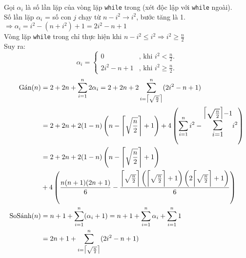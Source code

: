 \documentclass[../HW01.tex]{subfiles}
\begin{document}
\noindent
Gọi $\alpha_i$ là số lần lặp của vòng lặp \verb|while| trong (xét độc lập với \verb|while| ngoài).
\\Số lần lặp $\alpha_i$ = số con $j$ chạy từ $n-i^2 \to i^2$, bước tăng là 1.
\\$\Rightarrow \alpha_i=i^2-(n+i^2)+1=2i^2-n+1$
\\Vòng lặp \verb|while| trong chỉ thực hiện khi $n-i^2 \leq i^2 \Rightarrow i^2 \geq \frac{n}{2}$
\\Suy ra:
\\ $$\alpha_i=\begin{cases}
    0 &\text{, khi $i^2<\frac{n}{2}$}.\\
    2i^2-n+1 &\text{, khi $i^2 \geq \frac{n}{2}$}.
\end{cases}$$
\begin{align*}
    \text{Gán}(n)&=2+2n+\sum_{i=1}^{n}2\alpha_i=2+2n+2\sum_{i=\bigl\lceil\sqrt{\frac{n}{2}}\bigr\rceil}^{n}(2i^2-n+1)\\
    &=2+2n+2(1-n)\left(n-\Biggl\lceil\sqrt{\frac{n}{2}}\Biggr\rceil+1\right)+4\left(\sum_{i=1}^{n}i^2-\text{\Large$\sum_{i=1}^{\bigl\lceil\sqrt{\frac{n}{2}}\bigr\rceil-1}$}i^2\right)\\
    &=2+2n+2(1-n)\left(n-\Biggl\lceil\sqrt{\frac{n}{2}}\Biggr\rceil+1\right)\\
    &+4\left(\frac{n(n+1)(2n+1)}{6}-\frac{\biggl\lceil\sqrt{\frac{n}{2}}\biggr\rceil\left(\biggl\lceil\sqrt{\frac{n}{2}}\biggr\rceil+1\right)\left(2\biggl\lceil\sqrt{\frac{n}{2}}\biggr\rceil+1\right)}{6}\right)\\
    \text{SoSánh}(n)&=n+1+\sum_{i=1}^{n}(\alpha_i+1)=n+1+\sum_{i=1}^{n}\alpha_i+\sum_{i=1}^{n}1\\
    &=2n+1+\sum_{i=\bigl\lceil\sqrt{\frac{n}{2}}\bigr\rceil}^{n}(2i^2-n+1)
\end{align*}
\end{document}
